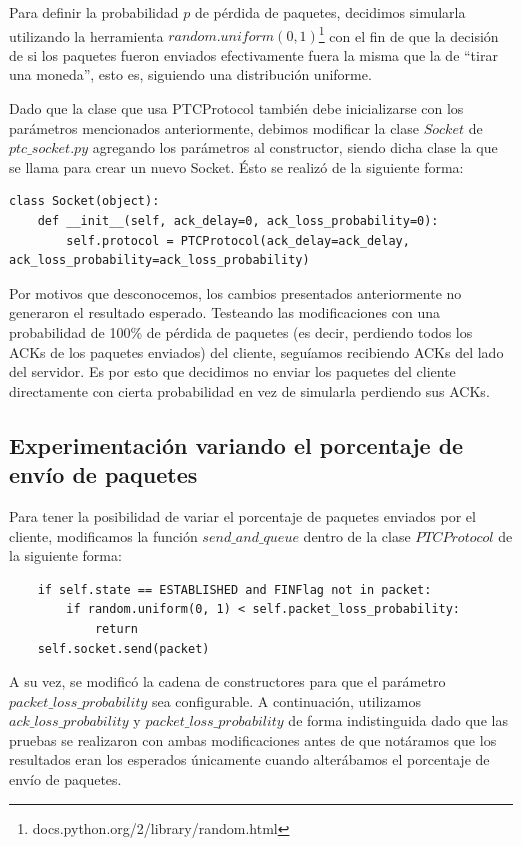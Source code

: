 \documentclass[10pt, a4paper]{article}
\begin{document}
Para definir la probabilidad $p$ de pérdida de paquetes, decidimos simularla utilizando la herramienta $random.uniform(0,1)$\footnote{docs.python.org/2/library/random.html} con el fin de que la decisión de si los paquetes fueron enviados efectivamente fuera la misma que la de ``tirar una moneda'', esto es, siguiendo una distribución uniforme.

Dado que la clase que usa PTCProtocol también debe inicializarse con los parámetros mencionados anteriormente, debimos modificar la clase $Socket$ de $ptc\_socket.py$ agregando los parámetros al constructor, siendo dicha clase la que se llama para crear un nuevo Socket. Ésto se realizó de la siguiente forma:
\begin{verbatim}
class Socket(object):
    def __init__(self, ack_delay=0, ack_loss_probability=0):
		self.protocol = PTCProtocol(ack_delay=ack_delay, ack_loss_probability=ack_loss_probability)
\end{verbatim}

Por motivos que desconocemos, los cambios presentados anteriormente no generaron el resultado esperado. Testeando las modificaciones con una probabilidad de 100\% de pérdida de paquetes (es decir, perdiendo todos los ACKs de los paquetes enviados) del cliente, seguíamos recibiendo ACKs del lado del servidor. Es por esto que decidimos no enviar los paquetes del cliente directamente con cierta probabilidad en vez de simularla perdiendo sus ACKs.

\subsection{Experimentación variando el porcentaje de envío de paquetes}
Para tener la posibilidad de variar el porcentaje de paquetes enviados por el cliente, modificamos la función $send\_and\_queue$ dentro de la clase $PTCProtocol$ de la siguiente forma:
 
 \begin{verbatim}
  	if self.state == ESTABLISHED and FINFlag not in packet:
		if random.uniform(0, 1) < self.packet_loss_probability:    
			return
	self.socket.send(packet)
 \end{verbatim}
A su vez, se modificó la cadena de constructores para que el parámetro $packet\_loss\_probability$ sea configurable. A continuación, utilizamos $ack\_loss\_probability$ y $packet\_loss\_probability$ de forma indistinguida dado que las pruebas se realizaron con ambas modificaciones antes de que notáramos que los resultados eran los esperados únicamente cuando alterábamos el porcentaje de envío de paquetes. 
\end{document}
